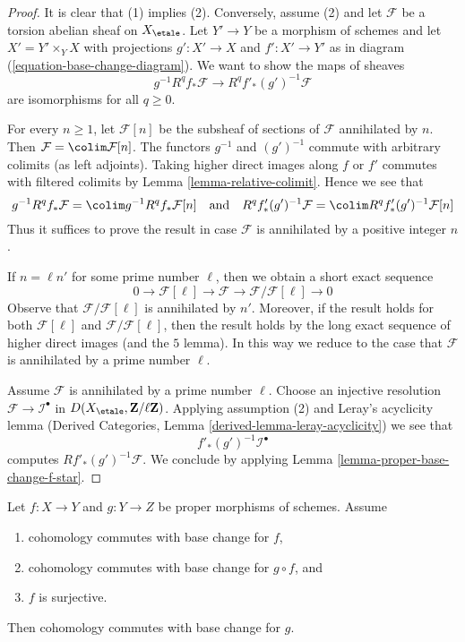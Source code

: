 \begin{proof}
It is clear that (1) implies (2). Conversely, assume (2) and let
$\mathcal{F}$ be a torsion abelian sheaf on $X_\etale$. Let $Y' \to Y$
be a morphism of schemes and let $X' = Y' \times_Y X$
with projections $g' : X' \to X$ and $f' : X' \to Y'$ as in
diagram (\ref{equation-base-change-diagram}).
We want to show the maps of sheaves
$$
g^{-1}R^qf_*\mathcal{F} \longrightarrow R^qf'_*(g')^{-1}\mathcal{F}
$$
are isomorphisms for all $q \geq 0$.

\medskip\noindent
For every $n \geq 1$, let $\mathcal{F}[n]$ be the subsheaf of sections
of $\mathcal{F}$ annihilated by $n$. Then
$\mathcal{F} = \colim \mathcal{F}[n]$.
The functors $g^{-1}$ and $(g')^{-1}$ commute with arbitrary colimits
(as left adjoints). Taking higher direct images along $f$ or $f'$
commutes with filtered colimits by Lemma \ref{lemma-relative-colimit}.
Hence we see that
$$
g^{-1}R^qf_*\mathcal{F} = \colim g^{-1}R^qf_*\mathcal{F}[n]
\quad\text{and}\quad
R^qf'_*(g')^{-1}\mathcal{F} =
\colim R^qf'_*(g')^{-1}\mathcal{F}[n]
$$
Thus it suffices to prove the result in case $\mathcal{F}$ is
annihilated by a positive integer $n$.

\medskip\noindent
If $n = \ell n'$ for some prime number $\ell$, then we obtain a short
exact sequence
$$
0 \to \mathcal{F}[\ell] \to \mathcal{F} \to
\mathcal{F}/\mathcal{F}[\ell] \to 0
$$
Observe that $\mathcal{F}/\mathcal{F}[\ell]$ is annihilated by $n'$.
Moreover, if the result holds for both $\mathcal{F}[\ell]$ and
$\mathcal{F}/\mathcal{F}[\ell]$, then the result holds by
the long exact sequence of higher direct images (and the $5$ lemma).
In this way we reduce to the case that $\mathcal{F}$ is annihilated
by a prime number $\ell$.

\medskip\noindent
Assume $\mathcal{F}$ is annihilated by a prime number $\ell$.
Choose an injective resolution $\mathcal{F} \to \mathcal{I}^\bullet$
in $D(X_\etale, \mathbf{Z}/\ell\mathbf{Z})$. Applying assumption
(2) and Leray's acyclicity lemma
(Derived Categories, Lemma \ref{derived-lemma-leray-acyclicity})
we see that
$$
f'_*(g')^{-1}\mathcal{I}^\bullet
$$
computes $Rf'_*(g')^{-1}\mathcal{F}$. We conclude by applying
Lemma \ref{lemma-proper-base-change-f-star}.
\end{proof}

\begin{lemma}
\label{lemma-sandwich}
Let $f : X \to Y$ and $g : Y \to Z$ be proper morphisms of schemes. Assume
\begin{enumerate}
\item cohomology commutes with base change for $f$,
\item cohomology commutes with base change for $g \circ f$, and
\item $f$ is surjective.
\end{enumerate}
Then cohomology commutes with base change for $g$.
\end{lemma}

